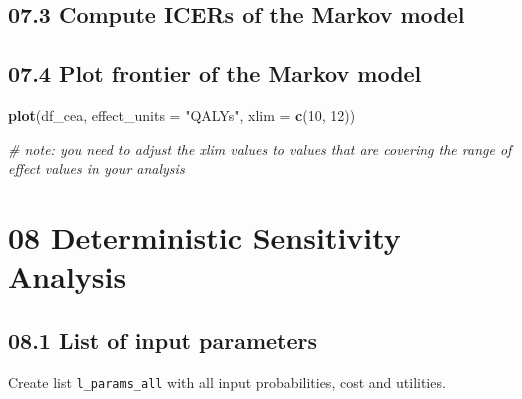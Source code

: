 \documentclass[]{article}
\newenvironment{Shaded}{\begin{snugshade}}{\end{snugshade}}
\newcommand{\KeywordTok}[1]{\textcolor[rgb]{0.13,0.29,0.53}{\textbf{#1}}}
\newcommand{\DataTypeTok}[1]{\textcolor[rgb]{0.13,0.29,0.53}{#1}}
\newcommand{\DecValTok}[1]{\textcolor[rgb]{0.00,0.00,0.81}{#1}}
\newcommand{\StringTok}[1]{\textcolor[rgb]{0.31,0.60,0.02}{#1}}
\newcommand{\CommentTok}[1]{\textcolor[rgb]{0.56,0.35,0.01}{\textit{#1}}}
\newcommand{\OperatorTok}[1]{\textcolor[rgb]{0.81,0.36,0.00}{\textbf{#1}}}
\newcommand{\NormalTok}[1]{#1}
\begin{document}
\subsection{07.3 Compute ICERs of the Markov
model}\label{compute-icers-of-the-markov-model}

\begin{Shaded}
\end{Shaded}

\subsection{07.4 Plot frontier of the Markov
model}\label{plot-frontier-of-the-markov-model}

\begin{Shaded}
\begin{Highlighting}[]
\KeywordTok{plot}\NormalTok{(df_cea, }\DataTypeTok{effect_units =} \StringTok{"QALYs"}\NormalTok{, }\DataTypeTok{xlim =} \KeywordTok{c}\NormalTok{(}\DecValTok{10}\NormalTok{, }\DecValTok{12}\NormalTok{))}

\CommentTok{# note: you need to adjust the xlim values to values that are covering the range of effect values in your analysis}
\end{Highlighting}
\end{Shaded}

\section{08 Deterministic Sensitivity
Analysis}\label{deterministic-sensitivity-analysis}

\subsection{08.1 List of input
parameters}\label{list-of-input-parameters}

Create list \texttt{l\_params\_all} with all input probabilities, cost
and utilities.
\end{document}
